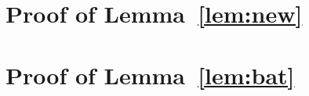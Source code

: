 \documentclass[letterpaper,10pt,journal,twoside]{IEEEtran}
\theoremstyle{definition}
\begin{document}
\section{Proof of Lemma~\ref{lem:new}}
\label{app:proof-new}

\section{Proof of Lemma~\ref{lem:bat}}
\label{app:proof-bat}


\end{document}
